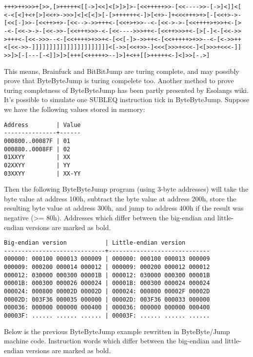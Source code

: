 \documentclass{article}
\begin{document}
\begin{verbatim}
+++>++>>>+[>>,[>+++++<[[->]<<]<[>]>]>-[<<+++++>>-[<<---->>-[->]<]]<[
<-<[<]+<+[>]<<+>->>>]<]<[<]>[-[>++++++<-]>[<+>-]+<<<+++>+>[-[<<+>->-
[<<[-]>>-[<<++>+>-[<<-->->>+++<-[<<+>+>>--<-[<<->->-[<<++++>+>>+<-[>
-<-[<<->->-[<<->>-[<<+++>>>-<-[<<---->>>++<-[<<++>>>+<-[>[-]<-[<<->>
>+++<-[<<->>>--<-[<<++++>+>>+<-[<<[-]>->>++<-[<<+++++>+>>--<-[<->>++
<[<<->>-]]]]]]]]]]]]]]]]]]]]]]<[->>[<<+>>-]<<<[>>>+<<<-]<[>>>+<<<-]]
>>]>[-[---[-<]]>]>[+++[<+++++>--]>]+<++[[>+++++<-]<]>>[-.>]
\end{verbatim}

\par This means, Brainfuck and BitBitJump are turing complete, and may possibly prove that ByteByteJump is turing compelete too. Another method to prove turing completness of ByteByteJump has been partly presented by Esolangs wiki. It's possible to simulate one SUBLEQ instruction tick in ByteByteJump. Suppose we have the following values stored in memory:

\begin{verbatim}
Address        | Value
---------------+------
000800..00087F | 01
000880..0008FF | 02
01XXYY         | XX
02XXYY         | YY
03XXYY         | XX-YY
\end{verbatim}

\par Then the following ByteByteJump program (using 3-byte addresses) will take the byte value at address 100h, subtract the byte value at address 200h, store the resulting byte value at address 300h, and jump to address 400h if the result was negative (>= 80h). Addresses which differ between the big-endian and little-endian versions are marked as bold.

\begin{verbatim}
Big-endian version           | Little-endian version
-----------------------------+-----------------------------
000000: 000100 000013 000009 | 000000: 000100 000013 000009
000009: 000200 000014 000012 | 000009: 000200 000012 000012
000012: 030000 000300 00001B | 000012: 030000 000300 00001B
00001B: 000300 000026 000024 | 00001B: 000300 000024 000024
000024: 000800 00002D 00002D | 000024: 000800 00002F 00002D
00002D: 003F36 000035 000000 | 00002D: 003F36 000033 000000
000036: 000000 000000 000400 | 000036: 000000 000000 000400
00003F: ...... ...... ...... | 00003F: ...... ...... ......
\end{verbatim}

\par Below is the previous ByteByteJump example rewritten in ByteByte/Jump machine code. Instruction words which differ between the big-endian and little-endian versions are marked as bold.
\end{document}
